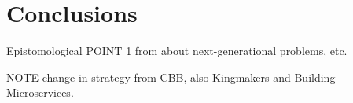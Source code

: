 \chapter{Conclusions}\label{ch:conclusions}

Epistomological
POINT 1 from about next-generational problems, etc.

NOTE change in strategy from CBB, also Kingmakers and Building Microservices.


\listoftodos